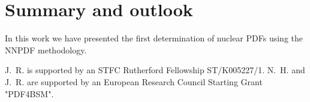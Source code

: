 
\section{Summary and outlook}

In this work we have presented the first determination
of nuclear PDFs using the NNPDF methodology.

\vspace{2cm}

%
J.~R. is supported by an STFC Rutherford Fellowship ST/K005227/1.
%
N.~H. and J.~R. are
supported by an European Research Council Starting Grant "PDF4BSM".
%

